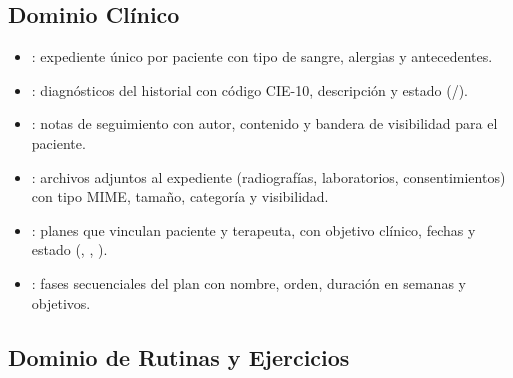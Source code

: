 \subsection{Dominio Clínico}

\begin{itemize}
  \item {}: expediente único por paciente con tipo de sangre, alergias y antecedentes.

  \item {}: diagnósticos del historial con código CIE-10, descripción y estado (/).

  \item {}: notas de seguimiento con autor, contenido y bandera de visibilidad para el paciente.

  \item {}: archivos adjuntos al expediente (radiografías, laboratorios, consentimientos) con tipo MIME, tamaño, categoría y visibilidad.

  \item {}: planes que vinculan paciente y terapeuta, con objetivo clínico, fechas y estado (, , ).

  \item {}: fases secuenciales del plan con nombre, orden, duración en semanas y objetivos.
\end{itemize}

\subsection{Dominio de Rutinas y Ejercicios}

